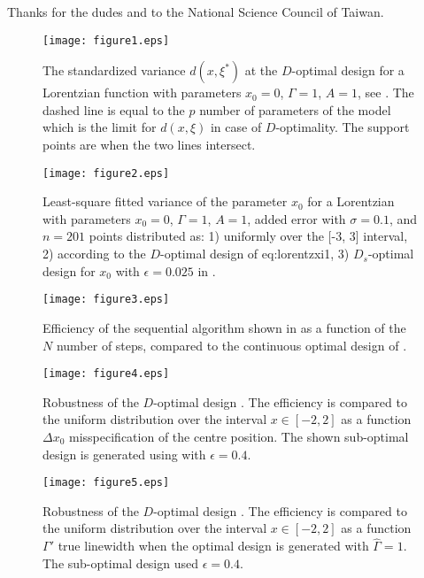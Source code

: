 \documentclass[12pt]{iopart}
\begin{document}
\ack Thanks for the dudes and to the National Science Council of Taiwan.


\begin{figure}
\texttt{[image: figure1.eps]}
\caption{The standardized variance $d(x, \xi^*)$ at the $D$-optimal design for a Lorentzian function with parameters $x_0=0$, $\Gamma = 1$, $A = 1$, see . The dashed line is equal to the $p$ number of parameters of the model which is the limit for $d(x, \xi)$ in case of $D$-optimality. The support points are when the two lines intersect.}
\label{fig:lorentz3d}
\end{figure}

\begin{figure}
\texttt{[image: figure2.eps]}
\caption{Least-square fitted variance of the parameter $x_0$ for a Lorentzian with parameters $x_0=0$, $\Gamma = 1$, $A = 1$, added error with $\sigma=0.1$, and $n=201$ points distributed as: 1) uniformly over the [-3, 3] interval, 2) according to the $D$-optimal design of {eq:lorentzxi1}, 3) $D_s$-optimal design for $x_0$ with $\epsilon = 0.025$ in .}
\label{fig:simvariance}
\end{figure}

\begin{figure}
\texttt{[image: figure3.eps]}
\caption{Efficiency of the sequential algorithm shown in  as a function of the $N$ number of steps, compared to the continuous optimal design of .}
\label{fig:xinefficiency}
\end{figure}

\begin{figure}
\texttt{[image: figure4.eps]}
\caption{Robustness of the $D$-optimal design . The efficiency is compared to the uniform distribution over the interval $x\in [-2,2]$ as a function $\Delta x_0$ misspecification of the centre position. The shown sub-optimal design is generated using  with $\epsilon = 0.4$.}
\label{fig:x0robust}
\end{figure}

\begin{figure}
\texttt{[image: figure5.eps]}
\caption{Robustness of the $D$-optimal design . The efficiency is compared to the uniform distribution over the interval $x\in [-2,2]$ as a function $\Gamma'$ true linewidth when the optimal design is generated with $\hat \Gamma = 1$. The sub-optimal design used $\epsilon = 0.4$.}
\label{fig:grobust}
\end{figure}
\end{document}
